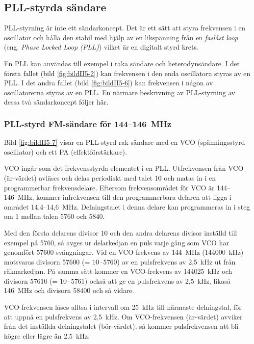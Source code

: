 \subsection{PLL-styrda sändare}

PLL-styrning är inte ett sändarkoncept. Det är ett sätt att styra
frekvensen i en oscillator och hålla den stabil med hjälp av en
likspänning från en \emph{faslåst loop} (eng. \emph{Phase Locked Loop (PLL)})
vilket är en digitalt styrd krets.

En PLL kan användas till exempel i raka sändare och heterodynsändare.
I det första fallet (bild \ref{fig:bildII5-2}) kan frekvensen i den enda
oscillatorn styras av en PLL.
I det andra fallet (bild \ref{fig:bildII5-6}) kan frekvensen i
någon av oscillatorerna styras av en PLL.
En närmare beskrivning av PLL-styrning av dessa två sändarkoncept följer här.

\subsubsection{PLL-styrd FM-sändare för 144--146~MHz}


Bild \ref{fig:bildII5-7} visar en PLL-styrd rak sändare med en
VCO (spänningsstyrd oscillator) och ett PA (effektförstärkare).

VCO ingår som det frekvensstyrda elementet i en PLL.
Utfrekvensen från VCO (är-värdet) avläses och delas periodiskt med talet 10
och matas in i en programmerbar frekvensdelare.
Eftersom frekvensområdet för VCO är 144--146~MHz, kommer infrekvensen till
den programmerbara delaren att ligga i området 14,4--14,6~MHz.
Delningstalet i denna delare kan programmeras in i steg om 1 mellan
talen 5760 och 5840.

Med den första delarens divisor 10 och den andra delarens divisor
inställd till exempel på 5760, så avges ur delarkedjan en puls varje gång som
VCO har genomfört 57600 svängningar.
Vid en VCO-frekvens av 144~MHz (144000~kHz) motsvaras divisorn
57600 (= \(10 \cdot 5760\)) av en pulsfrekvens av 2,5~kHz ut från räknarkedjan.
På samma sätt kommer en VCO-frekvens av 144025~kHz och divisorn
57610 (= \(10 \cdot 5761\)) också att ge en pulsfrekvens av 2,5~kHz,
likaså 146~MHz och divisorn 58400 och så vidare.

VCO-frekvensen låses alltså i intervall om 25~kHz till närmaste
delningstal, för att uppnå en pulsfrekvens av 2,5~kHz.
Om VCO-frekvensen (är-värdet) avviker från det inställda delningstalet
(bör-värdet), så kommer pulsfrekvensen att bli högre eller lägre än
\SI{2,5}{\kilo\hertz}.

